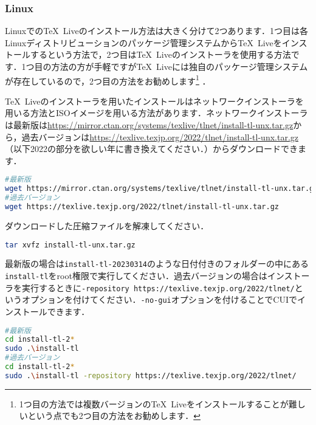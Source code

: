\subsubsection*{Linux}
Linuxでの\TeX\ Liveのインストール方法は大きく分けて2つあります．1つ目は各Linuxディストリビューションのパッケージ管理システムから\TeX\ Liveをインストールするという方法で，2つ目は\TeX\ Liveのインストーラを使用する方法です．1つ目の方法の方が手軽ですが\TeX\ Liveには独自のパッケージ管理システムが存在しているので，2つ目の方法をお勧めします\footnote{1つ目の方法では複数バージョンの\TeX\ Liveをインストールすることが難しいという点でも2つ目の方法をお勧めします．}	．

\TeX\ Liveのインストーラを用いたインストールはネットワークインストーラを用いる方法とISOイメージを用いる方法があります．ネットワークインストーラは最新版は\url{https://mirror.ctan.org/systems/texlive/tlnet/install-tl-unx.tar.gz}から，過去バージョンは\url{https://texlive.texjp.org/2022/tlnet/install-tl-unx.tar.gz}（以下2022の部分を欲しい年に書き換えてください．）からダウンロードできます．
\begin{lstlisting}[language=bash]
#最新版
wget https://mirror.ctan.org/systems/texlive/tlnet/install-tl-unx.tar.gz
#過去バージョン
wget https://texlive.texjp.org/2022/tlnet/install-tl-unx.tar.gz
\end{lstlisting}
ダウンロードした圧縮ファイルを解凍してください．
\begin{lstlisting}[language=bash]
tar xvfz install-tl-unx.tar.gz
\end{lstlisting}
最新版の場合は\texttt{install-tl-20230314}のような日付付きのフォルダーの中にある\texttt{install-tl}をroot権限で実行してください．過去バージョンの場合はインストーラを実行するときに\texttt{-repository https://texlive.texjp.org/2022/tlnet/}というオプションを付けてください．\texttt{-no-gui}オプションを付けることでCUIでインストールできます．
\begin{lstlisting}[language=bash]
#最新版
cd install-tl-2*
sudo .\install-tl
#過去バージョン
cd install-tl-2*
sudo .\install-tl -repository https://texlive.texjp.org/2022/tlnet/
\end{lstlisting}
